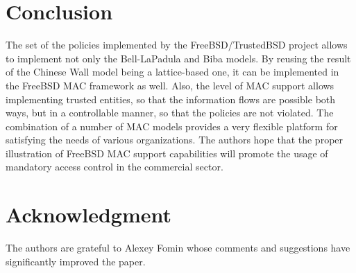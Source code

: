 \documentclass[10pt,a4paper,conference,onecolumn]{IEEEtran}
\begin{document}
\section{Conclusion}

The set of the policies implemented by the FreeBSD/TrustedBSD project allows
to implement not only the Bell-LaPadula and Biba models. By reusing the 
result of the Chinese Wall model being a lattice-based one, it can be
implemented in the FreeBSD MAC framework as well. Also, the level of MAC 
support allows implementing trusted entities, so that the information
flows are possible both ways, but in a controllable manner, so that the
policies are not violated. The combination of a number of MAC models
provides a very flexible platform for satisfying the needs of
various organizations. The authors hope that the proper illustration of
FreeBSD MAC support capabilities will promote the usage of mandatory
access control in the commercial sector.

\section*{Acknowledgment}

The authors are grateful to Alexey Fomin whose comments and suggestions
have significantly improved the paper.


\end{document}
